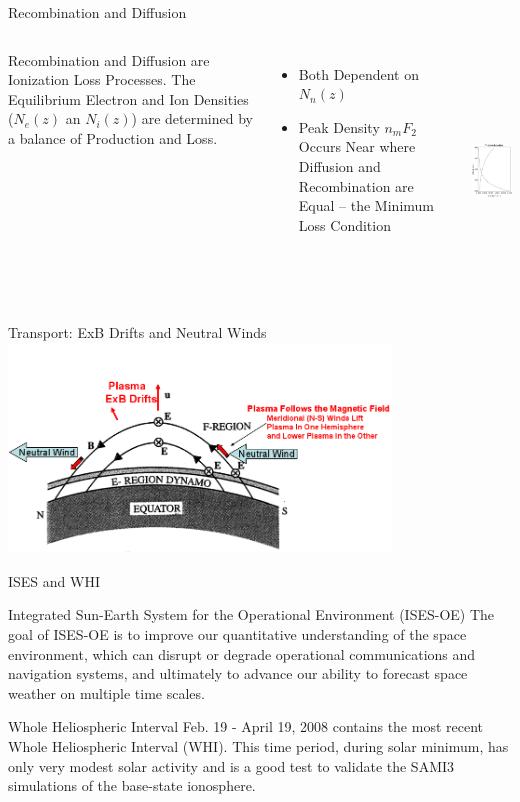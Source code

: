 \documentclass{beamer}
\begin{document}
\begin{frame}
  {Recombination and Diffusion}
  \begin{columns}
   \column{1.5in}\small
    Recombination and Diffusion are Ionization Loss Processes.
    The Equilibrium Electron and Ion Densities ($N_e(z)$ an $N_i(z)$) are determined by a balance of Production and Loss.
    \begin{itemize}
      \item      Both Dependent on $N_n(z)$
      \item      Peak Density $n_mF_2$ Occurs Near where Diffusion and Recombination are Equal – the Minimum Loss Condition
    \end{itemize}
   \column{1.5in}
    \includegraphics[height=2.5in]{loss}
  \end{columns}
\end{frame}

\begin{frame}
{Transport: ExB Drifts and Neutral Winds}
\includegraphics[width=4in]{plasma}
\end{frame}

\begin{frame}{ISES and WHI}
  \begin{block}{Integrated Sun-Earth System for the Operational Environment (ISES-OE)}
    The goal of ISES-OE is to improve our quantitative understanding of the space environment, which can disrupt or degrade operational communications and navigation systems, and ultimately to advance our ability to forecast space weather on multiple time scales.
  \end{block}
  \begin{block}{Whole Heliospheric Interval}
    Feb. 19 - April 19, 2008 contains the most recent Whole Heliospheric Interval (WHI).  This time period, during solar minimum, has only very modest solar activity and is a good test to validate the SAMI3 simulations of the base-state ionosphere.
  \end{block}
\end{frame}
\end{document}
